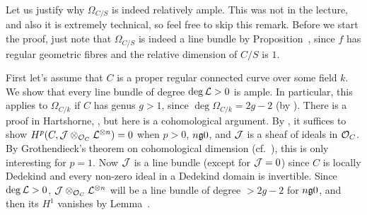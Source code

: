 \documentclass[a4paper,parskip=half,numbers=enddot, DIV=12]{scrreprt}
\begin{document}
\begin{rem}
	Let us justify why $\Omega_{C/S}$ is indeed relatively ample. This was not in the lecture, and also it is extremely technical, so feel free to skip this remark. Before we start the proof, just note that $\Omega_{C/S}$ is indeed a line bundle by Proposition~, since $f$ has regular geometric fibres and the relative dimension of $C/S$ is $1$.
	
	First let's assume that $C$ is a proper regular connected curve over some field $k$. We show that every line bundle of degree $\deg \mathcal{L}>0$ is ample. In particular, this applies to $\Omega_{C/k}$ if $C$ has genus $g>1$, since $\deg \Omega_{C/k}=2g-2$ (by \cite[Corollary~3.1.2]{alggeo2}). There is a proof in Hartshorne, \cite[Ch.\:III Corollary~3.3]{hartshorne}, but here is a cohomological argument. By \cite[Theorem~6]{alggeo2}, it suffices to show $H^p(C,\mathcal{J}\otimes_{\mathcal{O}_C}\mathcal{L}^{\otimes n})=0$ when $p>0$, $n\gge 0$, and $\mathcal{J}$ is a sheaf of ideals in $\mathcal{O}_C$. By Grothendieck's theorem on cohomological dimension (cf.\ \cite[Proposition~1.4.1]{alggeo2}), this is only interesting for $p=1$. Now $\mathcal{J}$ is a line bundle (except for $\mathcal{J}=0$) since $C$ is locally Dedekind and every non-zero ideal in a Dedekind domain is invertible. Since $\deg \mathcal{L}>0$, $\mathcal{J}\otimes_{\mathcal{O}_C}\mathcal{L}^{\otimes n}$ will be a line bundle of degree $>2g-2$ for $n\gge 0$, and then its $H^1$ vanishes by Lemma~.
	

\end{rem}
\end{document}
